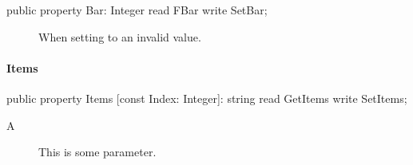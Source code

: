 \documentclass{report}
\begin{document}
\begin{list}{}{
\setlength{\itemindent}{0cm}
\setlength{\listparindent}{0cm}
\setlength{\leftmargin}{\evensidemargin}
\addtolength{\leftmargin}{\tmplength}
\settowidth{\labelsep}{X}
\addtolength{\leftmargin}{\labelsep}
\setlength{\labelwidth}{\tmplength}
}
\begin{flushleft}
\item[\textbf{Declaration}\hfill]
\begin{ttfamily}
public property Bar: Integer read FBar write SetBar;\end{ttfamily}


\end{flushleft}
\par
\item[\textbf{Description}]
 \par
\item[\textbf{Exceptions}]
\begin{description}
\item[\begin{ttfamily}TMyException\end{ttfamily}(\ref{A.TMyException})] When setting to an invalid value.
\end{description}


\end{list}
\paragraph*{Items}\hspace*{\fill}

\begin{list}{}{
\setlength{\itemindent}{0cm}
\setlength{\listparindent}{0cm}
\setlength{\leftmargin}{\evensidemargin}
\addtolength{\leftmargin}{\tmplength}
\settowidth{\labelsep}{X}
\addtolength{\leftmargin}{\labelsep}
\setlength{\labelwidth}{\tmplength}
}
\begin{flushleft}
\item[\textbf{Declaration}\hfill]
\begin{ttfamily}
public property Items [const Index: Integer]: string read GetItems write SetItems;\end{ttfamily}


\end{flushleft}
\par
\item[\textbf{Description}]
 \par
\item[\textbf{Parameters}]
\begin{description}
\item[A] This is some parameter.
\end{description}


\end{list}
\end{document}
